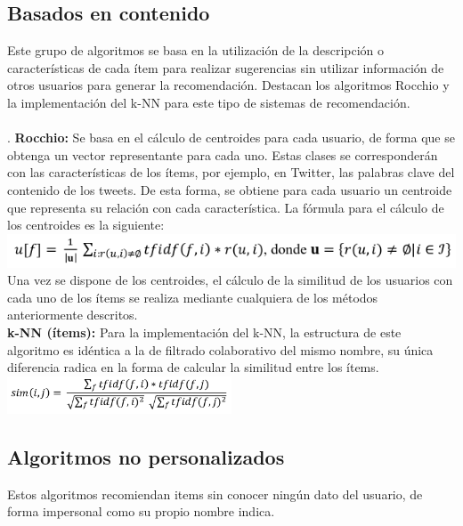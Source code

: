 		\subsection{Basados en contenido}
		Este grupo de algoritmos se basa en la utilización de la descripción o características de cada ítem para realizar sugerencias sin utilizar información de otros usuarios para generar la recomendación. Destacan los algoritmos Rocchio y la implementación del k-NN para este tipo de sistemas de recomendación.\\\\
.
		\textbf{Rocchio:} Se basa en el cálculo de centroides para cada usuario, de forma que se obtenga un vector representante para cada uno. Estas clases se corresponderán con las características de los ítems, por ejemplo, en Twitter, las palabras clave del contenido de los tweets. De esta forma, se obtiene para cada usuario un centroide que representa su relación con cada característica. La fórmula para el cálculo de los centroides es la siguiente:\cite{44}\\
		\includegraphics[width=\textwidth]{images/rocchio}
		Una vez se dispone de los centroides, el cálculo de la similitud de los usuarios con cada uno de los ítems se realiza mediante cualquiera de los métodos anteriormente descritos. \\

		\textbf{k-NN (ítems):} Para la implementación del k-NN, la estructura de este algoritmo es idéntica a la de filtrado colaborativo del mismo nombre, su única diferencia radica en la forma de calcular la similitud entre los ítems.\cite{44}\\
		\includegraphics[width=0.5\textwidth]{images/knn_items}

		\subsection{Algoritmos no personalizados}
		Estos algoritmos recomiendan items sin conocer ningún dato del usuario, de forma impersonal como su propio nombre indica. \\

